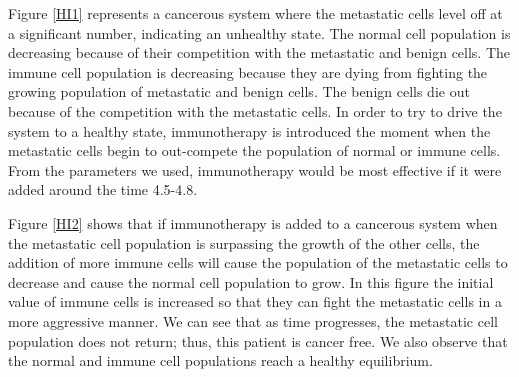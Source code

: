 \documentclass[letter,10pt]{article}
\begin{document}

Figure \ref{HI1} represents a cancerous system where the metastatic cells level off at a significant number, indicating an unhealthy state. The normal cell population is decreasing because of their competition with the metastatic and benign cells. The immune cell population is decreasing because they are dying from fighting the growing population of metastatic and benign cells. The benign cells die out because of the competition with the metastatic cells.  In order to try to drive the system to a healthy state, immunotherapy  is introduced the moment when the metastatic cells begin to out-compete the population of normal or immune cells. From the parameters we used, immunotherapy would be most effective if it were added around the time 4.5-4.8.


Figure \ref{HI2} shows that if immunotherapy is added to a cancerous system when the metastatic cell population is surpassing the growth of the other cells, the addition of more immune cells will cause the population of the metastatic cells to decrease and cause the normal cell population to grow.  In this figure the initial value of immune cells is increased so that they can fight the metastatic cells in a more aggressive manner. We can see that as time progresses, the metastatic cell population does not return; thus, this patient is cancer free. We also observe that the normal and immune cell populations reach a healthy equilibrium.
\end{document}
